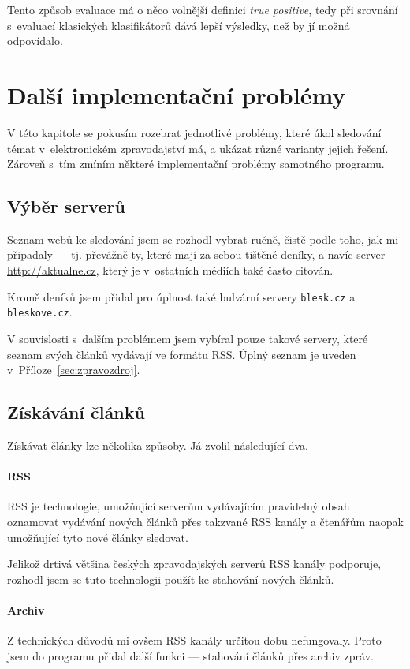 \documentclass[12pt,a4paper]{report}
\begin{document}
Tento způsob evaluace má o něco volnější definici \emph{true positive}, tedy při srovnání s~evaluací klasických klasifikátorů dává lepší výsledky, než by jí možná odpovídalo.

\chapter{Další implementační problémy}
V této kapitole se pokusím rozebrat jednotlivé problémy, které úkol sledování témat v~elektronickém zpravodajství má, a ukázat různé varianty jejich řešení. Zároveň s~tím zmíním některé implementační problémy samotného programu.

\section{Výběr serverů}
Seznam webů ke sledování jsem se rozhodl vybrat ručně, čistě podle toho, jak  mi připadaly --- tj. převážně ty, které mají za sebou tištěné deníky, a navíc server \url{http://aktualne.cz}, který je v~ostatních médiích také často citován. 

Kromě  deníků jsem přidal pro úplnost také bulvární servery \texttt{blesk.cz} a \texttt{bleskove.cz}.

V souvislosti s~dalším problémem jsem vybíral pouze takové servery, které seznam svých článků vydávají ve formátu RSS. Úplný seznam je uveden v~Příloze~\ref{sec:zpravozdroj}.

\section{Získávání článků}
\label{sec:ziskavani}
Získávat články lze několika způsoby. Já zvolil následující dva.

\subsubsection{RSS}
RSS je technologie, umožňující serverům vydávajícím pravidelný obsah oznamovat vydávání nových článků přes takzvané RSS kanály a čtenářům naopak umožňující tyto nové články sledovat.

Jelikož drtivá většina českých zpravodajských serverů RSS kanály podporuje, rozhodl jsem se tuto technologii použít ke stahování nových článků.

\subsubsection{Archiv}
Z technických důvodů mi ovšem RSS kanály určitou dobu nefungovaly. Proto jsem do programu přidal další funkci --- stahování článků přes archiv zpráv.
\end{document}
